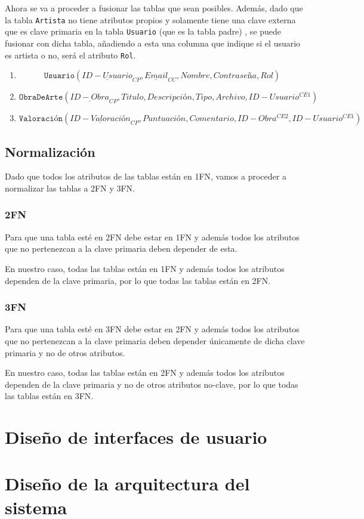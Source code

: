 \vspace{1cm}
Ahora se va a proceder a fusionar las tablas que sean posibles. Además,
dado que la tabla \texttt{Artista} no tiene atributos propios y solamente tiene
una clave externa que es clave primaria en la tabla \texttt{Usuario} (que es la
tabla padre) , se puede fusionar con dicha tabla, añadiendo a esta una columna
que indique si el usuario es artista o no, será el atributo \texttt{Rol}.

\begin{enumerate}
    \item \[ \texttt{Usuario}(\underline{ID-Usuario}_{CP}, \underline{Email}_{CC}, Nombre, Contraseña, Rol) \]
    \item \[ \texttt{ObraDeArte}(\underline{ID-Obra}_{CP}, Titulo, Descripción, Tipo, Archivo, ID-Usuario^{CE1}) \]
    \item \[ \texttt{Valoración}(\underline{ID-Valoración}_{CP}, Puntuación, Comentario, ID-Obra^{CE2}, ID-Usuario^{CE1}) \]
\end{enumerate}

\subsection{Normalización}
Dado que todos los atributos de las tablas están en 1FN, vamos a proceder a
normalizar las tablas a 2FN y 3FN.

\subsubsection{2FN}
Para que una tabla esté en 2FN debe estar en 1FN y además todos los atributos
que no pertenezcan a la clave primaria deben depender de esta.

En nuestro caso, todas las tablas están en 1FN y además todos los atributos
dependen de la clave primaria, por lo que todas las tablas están en 2FN.

\subsubsection{3FN}
Para que una tabla esté en 3FN debe estar en 2FN y además todos los atributos
que no pertenezcan a la clave primaria deben depender únicamente de dicha
clave primaria y no de otros atributos.

En nuestro caso, todas las tablas están en 2FN y además todos los atributos
dependen de la clave primaria y no de otros atributos no-clave, por lo que
todas las tablas están en 3FN.

\section{Diseño de interfaces de usuario}

\section{Diseño de la arquitectura del sistema}
